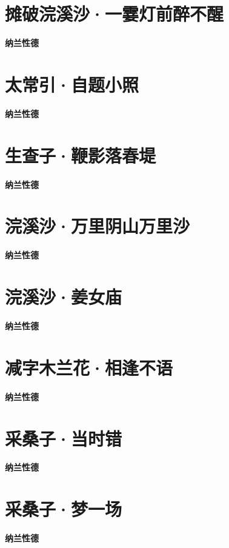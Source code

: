 \documentclass[12pt,a4paper]{ctexbook}
\begin{document}
\section{摊破浣溪沙·一霎灯前醉不醒}
\textbf{纳兰性德}\par\vspace{0.5em}

\section{ 太常引·自题小照 }
\textbf{纳兰性德}\par\vspace{0.5em}

\section{生查子·鞭影落春堤}
\textbf{纳兰性德}\par\vspace{0.5em}

\section{浣溪沙·万里阴山万里沙}
\textbf{纳兰性德}\par\vspace{0.5em}

\section{浣溪沙·姜女庙}
\textbf{纳兰性德}\par\vspace{0.5em}

\section{减字木兰花·相逢不语}
\textbf{纳兰性德}\par\vspace{0.5em}

\section{采桑子·当时错}
\textbf{纳兰性德}\par\vspace{0.5em}

\section{采桑子·梦一场}
\textbf{纳兰性德}\par\vspace{0.5em}
\end{document}
